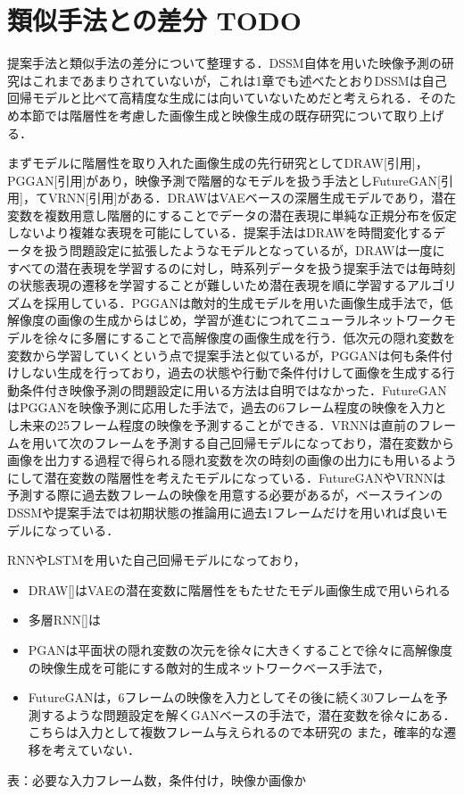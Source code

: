\section{類似手法との差分 TODO}
提案手法と類似手法の差分について整理する．DSSM自体を用いた映像予測の研究はこれまであまりされていないが，これは1章でも述べたとおりDSSMは自己回帰モデルと比べて高精度な生成には向いていないためだと考えられる．そのため本節では階層性を考慮した画像生成と映像生成の既存研究について取り上げる．

まずモデルに階層性を取り入れた画像生成の先行研究としてDRAW[引用]，PGGAN[引用]があり，映像予測で階層的なモデルを扱う手法としFutureGAN[引用]，てVRNN[引用]がある．DRAWはVAEベースの深層生成モデルであり，潜在変数を複数用意し階層的にすることでデータの潜在表現に単純な正規分布を仮定しないより複雑な表現を可能にしている．提案手法はDRAWを時間変化するデータを扱う問題設定に拡張したようなモデルとなっているが，DRAWは一度にすべての潜在表現を学習するのに対し，時系列データを扱う提案手法では毎時刻の状態表現の遷移を学習することが難しいため潜在表現を順に学習するアルゴリズムを採用している．PGGANは敵対的生成モデルを用いた画像生成手法で，低解像度の画像の生成からはじめ，学習が進むにつれてニューラルネットワークモデルを徐々に多層にすることで高解像度の画像生成を行う．低次元の隠れ変数を変数から学習していくという点で提案手法と似ているが，PGGANは何も条件付けしない生成を行っており，過去の状態や行動で条件付けして画像を生成する行動条件付き映像予測の問題設定に用いる方法は自明ではなかった．FutureGANはPGGANを映像予測に応用した手法で，過去の6フレーム程度の映像を入力とし未来の25フレーム程度の映像を予測することができる．VRNNは直前のフレームを用いて次のフレームを予測する自己回帰モデルになっており，潜在変数から画像を出力する過程で得られる隠れ変数を次の時刻の画像の出力にも用いるようにして潜在変数の階層性を考えたモデルになっている．FutureGANやVRNNは予測する際に過去数フレームの映像を用意する必要があるが，ベースラインのDSSMや提案手法では初期状態の推論用に過去1フレームだけを用いれば良いモデルになっている．

RNNやLSTMを用いた自己回帰モデルになっており，
\begin{itemize}
  \item DRAW[]はVAEの潜在変数に階層性をもたせたモデル画像生成で用いられる
  \item 多層RNN[]は
  \item PGANは平面状の隠れ変数の次元を徐々に大きくすることで徐々に高解像度の映像生成を可能にする敵対的生成ネットワークベース手法で，
  \item FutureGANは，6フレームの映像を入力としてその後に続く30フレームを予測するような問題設定を解くGANベースの手法で，潜在変数を徐々にある．こちらは入力として複数フレーム与えられるので本研究の
  また，確率的な遷移を考えていない．
\end{itemize}

表：必要な入力フレーム数，条件付け，映像か画像か




